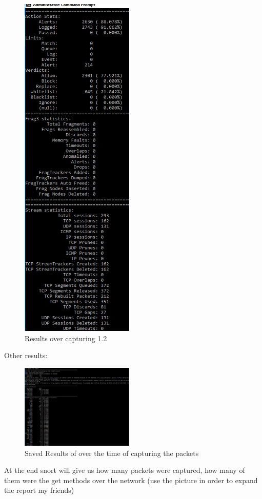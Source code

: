 \documentclass{article}
\begin{document}
\begin{figure}[H]
	\begin{center}
		\includegraphics[width=0.48\textwidth]{Res2.jpg}
	\end{center}
	\caption{Results over capturing 1.2}
	\label{fig:Res2}
\end{figure}


Other results:

\begin{figure}[H]
	\begin{center}
		\includegraphics[width=0.48\textwidth]{Res3.jpg}
	\end{center}
	\caption{Saved Results of over the time of capturing the packets}
	\label{fig:Res3}
\end{figure}

At the end snort will give us how many packets were captured, how many of them were the get methods over the network (use the picture in order to expand the report my friends)
\newpage
\tableofcontents



\end{document}
